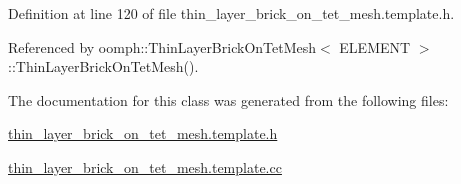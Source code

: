 Definition at line 120 of file thin\+\_\+layer\+\_\+brick\+\_\+on\+\_\+tet\+\_\+mesh.\+template.\+h.



Referenced by oomph\+::\+Thin\+Layer\+Brick\+On\+Tet\+Mesh$<$ E\+L\+E\+M\+E\+N\+T $>$\+::\+Thin\+Layer\+Brick\+On\+Tet\+Mesh().



The documentation for this class was generated from the following files\+:\begin{DoxyCompactItemize}
\item 
\hyperlink{thin__layer__brick__on__tet__mesh_8template_8h}{thin\+\_\+layer\+\_\+brick\+\_\+on\+\_\+tet\+\_\+mesh.\+template.\+h}\item 
\hyperlink{thin__layer__brick__on__tet__mesh_8template_8cc}{thin\+\_\+layer\+\_\+brick\+\_\+on\+\_\+tet\+\_\+mesh.\+template.\+cc}\end{DoxyCompactItemize}
